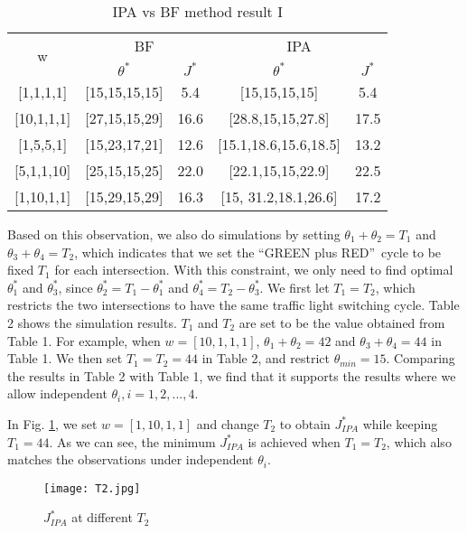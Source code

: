 \documentclass{ifacconf}\usepackage{graphicx}
\begin{document}
\begin{table}[tbh]
\caption{IPA vs BF method result I}\label{table1}	
\begin{center}\begin{tabular}
[c]{|c|c|c||c|c|}\hline
\multirow{2}{*}{w} & \multicolumn{2}{|c||}{BF} & \multicolumn{2}{|c|}{IPA}\\\cline{2-5}
 & $\theta^{*}$ & $J^{*}$ & $\theta^{*}$ & $J^{*}$\\\hline
{[1,1,1,1]}  & [15,15,15,15] & 5.4 & [15,15,15,15] & 5.4\\\hline
{[10,1,1,1]}  & [27,15,15,29] & 16.6 & [28.8,15,15,27.8] & 17.5\\\hline
{[1,5,5,1]}  & [15,23,17,21] & 12.6 & [15.1,18.6,15.6,18.5] & 13.2\\\hline
{[5,1,1,10]}  & [25,15,15,25] & 22.0 & [22.1,15,15,22.9] & 22.5\\\hline
{[1,10,1,1]}  & [15,29,15,29] & 16.3 & [15, 31.2,18.1,26.6] & 17.2\\\hline
\end{tabular}
\end{center}
\end{table}

Based on this observation, we also do simulations by setting $\theta_{1}+\theta_{2}=T_{1}$ and $\theta_{3}+\theta_{4}=T_{2}$, which
indicates that we set the \textquotedblleft GREEN plus RED\textquotedblright \ cycle to be fixed $T_{1}$ for each intersection. With this constraint, we only need to find optimal $\theta_{1}^{\ast}$ and $\theta_{3}^{\ast}$, since $\theta_{2}^{\ast}=T_{1}-\theta_{1}^{\ast}$ and $\theta_{4}^{\ast}=T_{2}-\theta_{3}^{\ast}$. We first let $T_{1}=T_{2}$, which restricts the two intersections to have the same traffic light switching cycle. Table 2 shows the simulation results. $T_1$ and $T_2$ are set to be the value obtained from Table 1. For example, when $w=[10,1,1,1]$, $\theta_1+\theta_2=42$ and $\theta_3+\theta_4=44$ in Table 1. We then set $T_1=T_2=44$ in Table 2, and restrict $\theta_{min}=15$. Comparing the results in Table 2 with Table 1, we find that it supports the results where we allow independent $\theta_i, i=1,2,...,4$.

In Fig. \ref{T2}, we set $w=[1,10,1,1]$ and change $T_2$ to obtain $J_{IPA}^{*}$ while keeping $T_1= 44$. As we can see, the minimum $J_{IPA}^{*}$ is achieved when $T_1=T_2$, which also matches the observations under independent $\theta_i$. 


\begin{figure}[tbh]
\centering
\texttt{[image: T2.jpg]}\caption{$J_{IPA}^{*}$ at different $T_2$}\label{T2}\end{figure}
\end{document}
